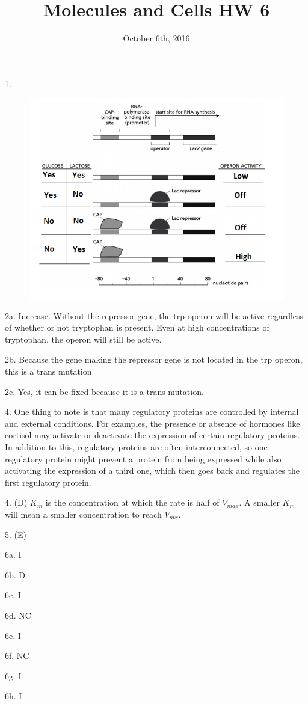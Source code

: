 \documentclass{article}
\title{Molecules and Cells HW 6}
\date{October 6th, 2016}
\begin{document}
\maketitle

1. \begin{figure}[h]
  \centering
 \includegraphics[scale=0.5]{P1.png}
\end{figure}


2a. Increase. Without the repressor gene, the trp operon will be active regardless of whether or not tryptophan is present. Even at high concentrations of tryptophan, the operon will still be active.

2b. Because the gene making the repressor gene is not located in the trp operon, this is a trans mutation

2c. Yes, it can be fixed because it is a trans mutation.
\vspace{5mm}

4. One thing to note is that many regulatory proteins are controlled by internal and external conditions. For examples, the presence or absence of hormones like cortisol may activate or deactivate the expression of certain regulatory proteins. In addition to this, regulatory proteins are often interconnected, so one regulatory protein might prevent a protein from being expressed while also activating the expression of a third one, which then goes back and regulates the first regulatory protein.
\vspace{5mm}

4. (D) $K_m$ is the concentration at which the rate is half of $V_{max}$. A smaller $K_m$ will mean a smaller concentration to reach $V_{mx}$.
\vspace{5mm}

5. (E)
\vspace{5mm}

6a. I

6b. D

6c. I

6d. NC

6e. I

6f. NC

6g. I

6h. I
\end{document}
